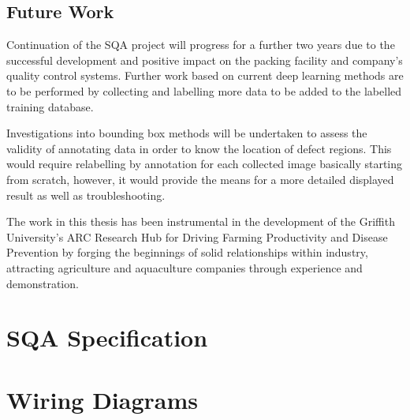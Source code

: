 \documentclass[fleqn,twoside,12pt]{report}
\begin{document}
\section{Future Work}

Continuation of the SQA project will progress for a further two years due to the successful development and positive impact on the packing facility and company's quality control systems. Further work based on current deep learning methods are to be performed by collecting and labelling more data to be added to the labelled training database. 

Investigations into bounding box methods will be undertaken to assess the validity of annotating data in order to know the location of defect regions. This would require relabelling by annotation for each collected image basically starting from scratch, however, it would provide the means for a more detailed displayed result as well as troubleshooting.

The work in this thesis has been instrumental in the development of the Griffith University's ARC Research Hub for Driving Farming Productivity and Disease Prevention by forging the beginnings of solid relationships within industry, attracting agriculture and aquaculture companies through experience and demonstration. 




\newpage





\newpage
\appendix
\chapter{SQA Specification}
\label{app:sqa_specs}

\newpage


\begin{minipage}[b]{0.9\linewidth}
	
\end{minipage}




\newpage

\chapter{Wiring Diagrams}
\label{app:wiring}
\end{document}
